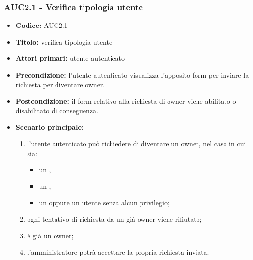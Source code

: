 \documentclass[casi-duso]{subfiles}
\begin{document}
\subsubsection{AUC2.1 - Verifica tipologia utente}%
\label{subsub:AUC2.1}
\begin{itemize}
  \item \textbf{Codice:} AUC2.1
  \item \textbf{Titolo:} verifica tipologia utente
  \item \textbf{Attori primari:} utente autenticato
  \item \textbf{Precondizione:} l'utente autenticato visualizza l'apposito form per inviare la richiesta per diventare owner.
  \item \textbf{Postcondizione:} il form relativo alla richiesta di owner viene abilitato o disabilitato di conseguenza.
  \item \textbf{Scenario principale:}
  \begin{enumerate}
    \item l'utente autenticato può richiedere di diventare un owner, nel caso in cui sia:
    \begin{itemize}
      \item un ,
      \item un ,
      \item un  oppure un utente senza alcun privilegio;
    \end{itemize}
    \item ogni tentativo di richiesta da un già owner viene rifiutato;
    \item {} è già un owner;
    \item l'amministratore potrà accettare la propria richiesta inviata.
  \end{enumerate}
\end{itemize}
\end{document}
